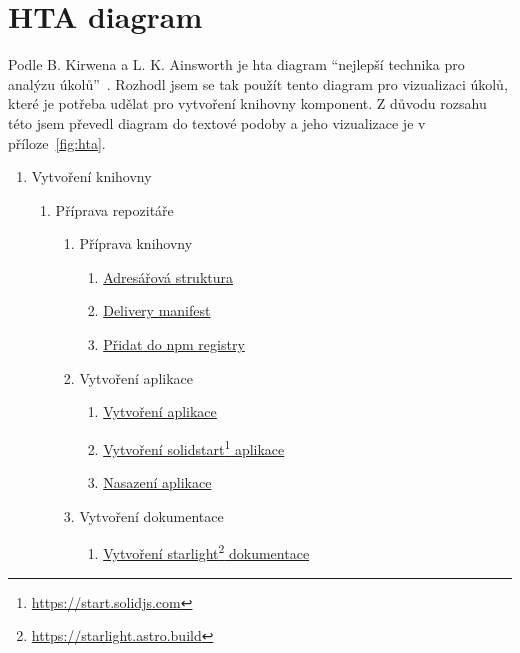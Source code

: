 \section{HTA diagram}

Podle B. Kirwena a L. K. Ainsworth je \gls{hta} diagram ``nejlepší technika pro analýzu úkolů''~\cite{kirwan1992}.
Rozhodl jsem se tak použít tento diagram pro vizualizaci úkolů, které je potřeba udělat pro vytvoření knihovny komponent.
Z důvodu rozsahu této jsem převedl diagram do textové podoby a jeho vizualizace je v příloze~\ref{fig:hta}.

\begin{enumerate}[label=\arabic*.]
    \item Vytvoření knihovny
          \begin{enumerate}[label*=\arabic*.]
              \item Příprava repozitáře
                    \begin{enumerate}[label*=\arabic*.]
                        \item Příprava knihovny
                              \begin{enumerate}[label*=\arabic*.]
                                  \item \ul{Adresářová struktura}
                                  \item \ul{Delivery manifest}
                                  \item \ul{Přidat do npm registry}
                              \end{enumerate}
                        \item Vytvoření aplikace
                              \begin{enumerate}[label*=\arabic*.]
                                  \item \ul{Vytvoření aplikace}
                                  \item \ul{Vytvoření solidstart\footnote{\url{https://start.solidjs.com}} aplikace}
                                  \item \ul{Nasazení aplikace}
                              \end{enumerate}
                        \item Vytvoření dokumentace
                              \begin{enumerate}[label*=\arabic*.]
                                  \item \ul{Vytvoření starlight\footnote{\url{https://starlight.astro.build}} dokumentace}

\end{enumerate}
\end{enumerate}
\end{enumerate}
\end{enumerate}
